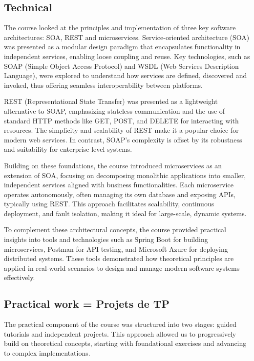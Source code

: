 \subsection{Technical}
\indent \indent The course looked at the principles and implementation of three key software architectures: SOA, REST and microservices.
Service-oriented architecture (SOA) was presented as a modular design paradigm that encapsulates functionality in independent services, enabling loose coupling and reuse.
Key technologies, such as SOAP (Simple Object Access Protocol) and WSDL (Web Services Description Language), were explored to understand how services are defined, discovered and invoked, thus offering seamless interoperability between platforms.

REST (Representational State Transfer) was presented as a lightweight alternative to SOAP, emphasizing stateless communication and the use of standard HTTP methods like GET, POST, and DELETE for interacting with resources. 
The simplicity and scalability of REST make it a popular choice for modern web services. 
In contrast, SOAP’s complexity is offset by its robustness and suitability for enterprise-level systems.

Building on these foundations, the course introduced microservices as an extension of SOA, focusing on decomposing monolithic applications into smaller, independent services aligned with business functionalities. 
Each microservice operates autonomously, often managing its own database and exposing APIs, typically using REST. This approach facilitates scalability, continuous deployment, and fault isolation, making it ideal for large-scale, dynamic systems.

To complement these architectural concepts, the course provided practical insights into tools and technologies such as Spring Boot for building microservices, Postman for API testing, and Microsoft Azure for deploying distributed systems. 
These tools demonstrated how theoretical principles are applied in real-world scenarios to design and manage modern software systems effectively.

\subsection{Practical work = Projets de TP}
The practical component of the course was structured into two stages: guided tutorials and independent projects. This approach allowed us to progressively build on theoretical concepts, starting with foundational exercises and advancing to complex implementations.
\\
